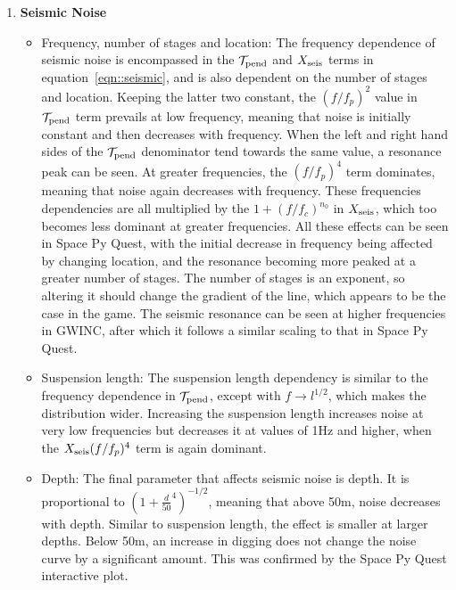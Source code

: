 \documentclass{article}
\begin{document}
\begin{enumerate}
    \item \textbf{Seismic Noise}
    \begin{itemize}
    \item Frequency, number of stages and location: The frequency
      dependence of seismic noise is encompassed in the
      $\mathcal{T}_{\rm pend}$ and $X_{\rm seis}$ terms in
      equation~\ref{eqn::seismic}, and is also dependent on the number
      of
      stages and location. Keeping the latter two constant, the
      $(f/f_p)^2$ value in $\mathcal{T}_{\rm pend}$ term prevails at low
      frequency, meaning that noise is initially constant and then
      decreases with frequency. When the left and right hand sides of
      the $\mathcal{T}_{\rm pend}$ denominator tend towards the same
      value, a resonance peak can be seen. At greater frequencies, the
      $(f/f_p)^4$ term dominates, meaning that noise again decreases
      with frequency. These frequencies dependencies are all
      multiplied by the $1+(f/f_c)^{n_0}$ in $X_{\rm seis}$, which too
      becomes less dominant at greater frequencies. All these effects
      can be seen in Space Py Quest, with the initial decrease in
      frequency being affected by changing location, and the resonance
      becoming more peaked at a greater number of stages. The number
      of stages is an exponent, so altering it should change the
      gradient of the line, which appears to be the case in the
      game. The seismic resonance can be seen at higher frequencies in
      GWINC, after which it follows a similar scaling to that in
      Space Py Quest. 
    \item Suspension length: The suspension length dependency is
      similar to the frequency dependence in $\mathcal{T}_{\rm pend}$,
      except with $f\rightarrow l^{1/2}$, which makes the distribution
      wider. Increasing the suspension length increases noise at very
      low frequencies but decreases it at values of 1Hz and higher,
      when the $X_{\rm seis}(f/f_p)^4$ term is again dominant. 
    \item Depth: The final parameter that affects seismic noise is
      depth. It is proportional to $(1+\frac{d}{50}^4)^{-1/2}$,
      meaning that above 50m, noise decreases with depth. Similar to
      suspension length, the effect is smaller at larger depths. Below
      50m, an increase in digging does not change the noise curve by a
      significant amount. This was confirmed by the Space Py Quest
      interactive plot.
    \end{itemize}
    

\end{enumerate}
\end{document}
